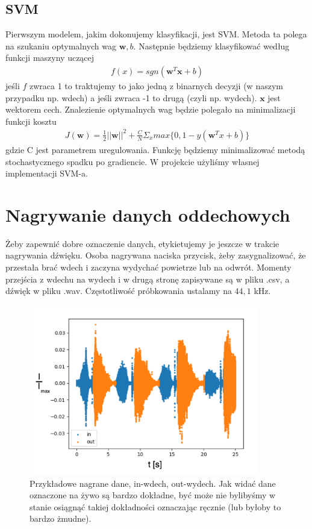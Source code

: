\documentclass[polish]{article}
\begin{document}
\subsection{SVM}
Pierwszym modelem, jakim dokonujemy klasyfikacji, jest SVM. Metoda ta polega na szukaniu optymalnych wag $\boldsymbol{w}, b$.
Następnie będziemy klasyfikować według funkcji maszyny uczącej 
\begin{gather*}
	f(x) = sgn(\boldsymbol{w}^T \boldsymbol{x} + b)
\end{gather*}
jeśli $f$ zwraca 1 to traktujemy to jako jedną z binarnych decyzji (w naszym przypadku np. wdech) a jeśli zwraca -1 to drugą (czyli np. wydech).
$\textbf{x}$ jest wektorem cech.  Znalezienie optymalnych wag będzie polegało na minimalizacji
funkcji kosztu
\begin{gather*}
	J(\boldsymbol{w}) = \frac{1}{2}||\boldsymbol{w}||^2 + \frac{C}{N}\Sigma_x max\{0, 1 - y(\boldsymbol{w}^Tx + b)\}
\end{gather*}
gdzie C jest parametrem uregulowania. Funkcję będziemy minimalizować metodą stochastycznego spadku po gradiencie.
W projekcie użyliśmy własnej implementacji SVM-a.
\section{Nagrywanie danych oddechowych}
Żeby zapewnić dobre oznaczenie danych, etykietujemy je jeszcze w trakcie nagrywania dźwięku. 
Osoba nagrywana naciska przycisk, żeby zasygnalizować, że przestała brać wdech i zaczyna wydychać 
powietrze lub na odwrót. Momenty przejścia z wdechu na wydech i w drugą stronę zapisywane są w pliku
.csv, a dźwięk w pliku .wav. Częstotliwość próbkowania ustalamy na $44,1$ kHz.
\begin{figure}[H]
	\centering
	\includegraphics[width=10cm]{nagrywanie_ozn}
	\caption{Przykładowe nagrane dane, in-wdech, out-wydech. Jak widać dane oznaczone na żywo są bardzo dokładne, być może nie bylibyśmy w stanie osiągnąć takiej
dokładności oznaczając ręcznie (lub byłoby to bardzo żmudne).}
\end{figure}
\end{document}
